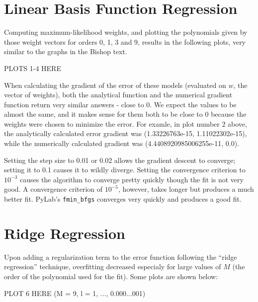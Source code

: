 \documentclass{paper}
\begin{document}
\section{Linear Basis Function Regression}

Computing maximum-likelihood weights, and plotting the polynomials given by those weight vectors for orders 0, 1, 3 and 9, results in the following plots, very similar to the graphs in the Bishop text.

PLOTS 1-4 HERE

When calculating the gradient of the error of these models (evaluated on $w$, the vector of weights), both the analytical function and the numerical gradient function return very similar answers - close to 0. We expect the values to be almost the same, and it makes sense for them both to be close to 0 because the weights were chosen to minimize the error. For examle, in plot number 2 above, the analytically calculated error gradient was (1.33226763e-15, 1.11022302e-15), while the numerically calculated gradient was (4.4408920985006255e-11, 0.0).

Setting the step size to 0.01 or 0.02 allows the gradient descent to converge; setting it to 0.1 causes it to wildly diverge. Setting the convergence criterion to $10^{-3}$ causes the algorithm to converge pretty quickly though the fit is not very good. A convergence criterion of $10^{-5}$, however, takes longer but produces a much better fit. PyLab's \texttt{fmin\_bfgs} converges very quickly and produces a good fit.

\section{Ridge Regression}

Upon adding a regularization term to the error function following the ``ridge regression'' technique, overfitting decreased especialy for large values of $M$ (the order of the polynomial used for the fit). Some plots are shown below:

PLOT 6 HERE
(M = 9, l = 1, ..., 0.000...001)
\end{document}
